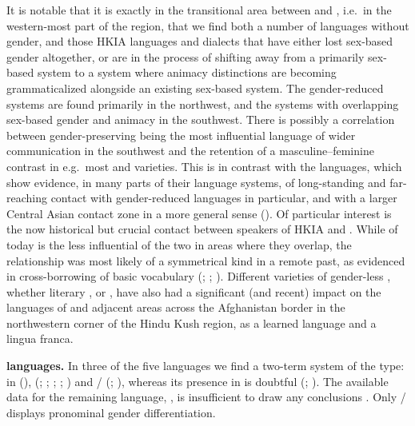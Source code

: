 \documentclass[output=collectionpaper]{langsci/langscibook}
\begin{document}
It is notable that it is exactly in the transitional area between  and , i.e.\ in the western-most part of the region, that we find both a number of  languages without gender, and those HKIA languages and dialects that have either lost sex-based gender altogether, or are in the process of shifting away from a primarily sex-based system to a system where animacy distinctions are becoming grammaticalized alongside an existing sex-based system. The gender-reduced systems are found primarily in the northwest, and the systems with overlapping sex-based gender and animacy in the southwest. There is possibly a correlation between gender-preserving  being the most influential language of wider communication in the southwest and the retention of a masculine--feminine contrast in e.g.\ most  and  varieties. This is in contrast with the  languages, which show evidence, in many parts of their language systems, of long-standing and far-reaching contact with gender-reduced  languages in particular, and with a larger Central Asian contact zone in a more general sense (\citealt[176--177]{Bashir1996}). Of particular interest is the now historical but crucial contact between speakers of HKIA  and  . While  of today is the less influential of the two in areas where they overlap, the relationship was most likely of a symmetrical kind in a remote past, as evidenced in cross-borrowing of basic vocabulary (\citealt{Morgenstierne1936}; \citealt[441--442]{Morgenstierne1938}; \citealt[208--210]{Bashir2007}). Different varieties of gender-less , whether literary ,  or , have also had a significant (and recent) impact on the languages of  and adjacent areas across the Afghanistan border in the northwestern corner of the Hindu Kush region, as a learned language and a lingua franca.

\textbf{ languages.} In three of the five  languages we find a two-term system of the  type: in  (\citealt[39--91]{Degener1998}),  (\citealt{Morgenstierne1929}; \citealt{Morgenstierne1934b}; \citealt{Morgenstierne1952}; \citealt{Buddruss2006}; \citealt{Grjunberg1999}) and / (\citealt{Strand2015}; \citealt[59--71]{Edelman1983}), whereas its presence in  is doubtful (\citealt{Morgenstierne1949}; \citealt[69]{Buddruss2017}). The available data for the remaining language, , is insufficient to draw any conclusions \citep{Morgenstierne1952}. Only / displays pronominal gender differentiation.
\end{document}
